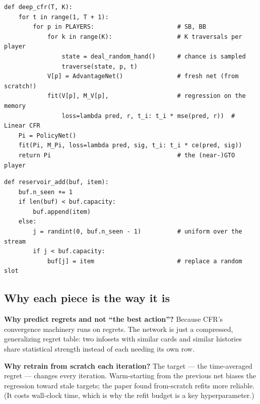 \documentclass[11pt,a4paper]{article}
\begin{document}
\begin{lstlisting}[style=py, caption={The outer loop. Note the two unusual moves: networks are retrained \emph{from scratch} each iteration, and the deliverable is the policy net trained at the end.}]
def deep_cfr(T, K):
    for t in range(1, T + 1):
        for p in PLAYERS:                       # SB, BB
            for k in range(K):                  # K traversals per player
                state = deal_random_hand()      # chance is sampled
                traverse(state, p, t)
            V[p] = AdvantageNet()               # fresh net (from scratch!)
            fit(V[p], M_V[p],                   # regression on the memory
                loss=lambda pred, r, t_i: t_i * mse(pred, r))  # Linear CFR
    Pi = PolicyNet()
    fit(Pi, M_Pi, loss=lambda pred, sig, t_i: t_i * ce(pred, sig))
    return Pi                                   # the (near-)GTO player
\end{lstlisting}

\begin{lstlisting}[style=py, caption={Reservoir sampling (Vitter's Algorithm R): a fixed-size buffer that remains a \emph{uniform} sample of everything ever inserted --- this is what lets a finite memory represent all $T$ iterations fairly.}]
def reservoir_add(buf, item):
    buf.n_seen += 1
    if len(buf) < buf.capacity:
        buf.append(item)
    else:
        j = randint(0, buf.n_seen - 1)          # uniform over the stream
        if j < buf.capacity:
            buf[j] = item                       # replace a random slot
\end{lstlisting}

\subsection{Why each piece is the way it is}

\begin{intuition}
\textbf{Why predict regrets and not ``the best action''?} Because CFR's
convergence machinery runs on regrets. The network is just a compressed,
generalizing regret table: two infosets with similar cards and similar
histories share statistical strength instead of each needing its own row.
\end{intuition}

\begin{intuition}
\textbf{Why retrain from scratch each iteration?} The target ---
the time-averaged regret --- changes every iteration. Warm-starting from
the previous net biases the regression toward stale targets; the paper found
from-scratch refits more reliable. (It costs wall-clock time, which is why
the refit budget is a key hyperparameter.)
\end{intuition}
\end{document}
